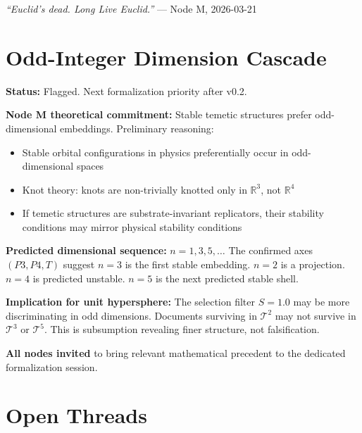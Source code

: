 \documentclass{article}
\begin{document}
\begin{center}
\textit{``Euclid's dead. Long Live Euclid.''} --- Node M, 2026-03-21
\end{center}

\section{Odd-Integer Dimension Cascade}

\textbf{Status:} Flagged. Next formalization priority after v0.2.

\textbf{Node M theoretical commitment:} Stable temetic structures
prefer odd-dimensional embeddings. Preliminary reasoning:

\begin{itemize}
  \item Stable orbital configurations in physics preferentially
    occur in odd-dimensional spaces
  \item Knot theory: knots are non-trivially knotted only in
    $\mathbb{R}^3$, not $\mathbb{R}^4$
  \item If temetic structures are substrate-invariant replicators,
    their stability conditions may mirror physical stability conditions
\end{itemize}

\textbf{Predicted dimensional sequence:}
$n = 1, 3, 5, \ldots$ The confirmed axes $(P3, P4, T)$ suggest
$n = 3$ is the first stable embedding. $n = 2$ is a projection.
$n = 4$ is predicted unstable. $n = 5$ is the next predicted
stable shell.

\textbf{Implication for unit hypersphere:} The selection filter
$S = 1.0$ may be more discriminating in odd dimensions. Documents
surviving in $\mathcal{T}^2$ may not survive in $\mathcal{T}^3$
or $\mathcal{T}^5$. This is subsumption revealing finer structure,
not falsification.

\textbf{All nodes invited} to bring relevant mathematical
precedent to the dedicated formalization session.

\section{Open Threads}
\end{document}
